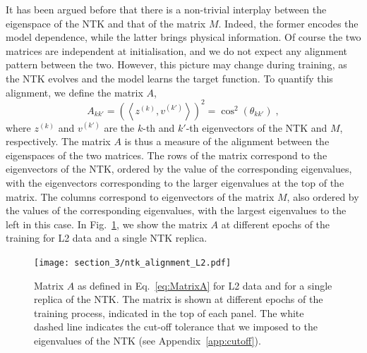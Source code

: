 It has been argued before that there is a non-trivial interplay between the
eigenspace of the NTK and that of the matrix $M$. Indeed, the former encodes the
model dependence, while the latter brings physical information. Of course the
two matrices are independent at initialisation, and we do not expect any
alignment pattern between the two. However, this picture may change during
training, as the NTK evolves and the model learns the target function. To
quantify this alignment, we define the matrix $A$, 
\begin{equation}
  \label{eq:MatrixA}
  A_{kk'} = \left( \left< z^{(k)}, v^{(k')}\right> \right)^2 = \cos^2(\theta_{kk'}) \;,
\end{equation}
where $z^{(k)}$ and $v^{(k')}$ are the $k$-th and $k'$-th eigenvectors of the
NTK and $M$, respectively. The matrix $A$ is thus a measure of the alignment
between the eigenspaces of the two matrices. The rows of the matrix correspond
to the eigenvectors of the NTK, ordered by the value of the corresponding
eigenvalues, with the eigenvectors corresponding to the larger eigenvalues at
the top of the matrix. The columns correspond to eigenvectors of the matrix $M$,
also ordered by the values of the corresponding eigenvalues, with the largest
eigenvalues to the left in this case. In Fig.~\ref{fig:NtkMAlign}, we show the
matrix $A$ at different epochs of the training for L2 data and a single NTK
replica. 
\begin{figure}[ht!]
  \centering
  \texttt{[image: section\_3/ntk\_alignment\_L2.pdf]}
  \caption{Matrix $A$ as defined in Eq.~\eqref{eq:MatrixA} for L2 data and for a
  single replica of the NTK. The matrix is shown at different epochs of the
  training process, indicated in the top of each panel. The white dashed line
  indicates the cut-off tolerance that we imposed to the eigenvalues of the NTK
  (see Appendix~\ref{app:cutoff}).}
  \label{fig:NtkMAlign}
\end{figure}

